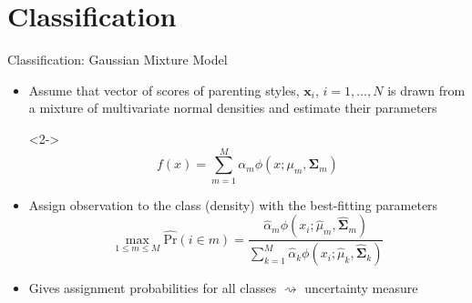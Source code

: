 \documentclass[notes, 12.5pt, aspectratio=169]{beamer}
\begin{document}
\section{Classification}
\begin{frame}{Classification: Gaussian Mixture Model}
	\begin{itemize}[(I)]
		\item<1-> Assume that vector of scores of parenting styles, $\bm{x}_i$, $i=1,\ldots,N$ is drawn from a mixture of multivariate normal densities and estimate their parameters
		\item[]<2-> \begin{equation*} f(x) = \sum_{m=1}^{M} \alpha_m \phi(x; \mu_m, \bm{\Sigma}_m) \end{equation*}
		\item<3-> Assign observation to the class (density) with the best-fitting parameters \begin{equation*}
			\max_{1 \leqslant m \leqslant M} \widehat{\text{Pr}}(i \in m) = \frac{\widehat{\alpha}_m \phi(x_i; \widehat{\mu}_m, \widehat{\bm{\Sigma}}_m)}{\sum_{k=1}^{M} \widehat{\alpha}_k \phi(x_i; \widehat{\mu}_k, \widehat{\bm{\Sigma}}_k)}
		\end{equation*}
	\item<4-> Gives assignment probabilities for all classes $\rightsquigarrow$ uncertainty measure
	\end{itemize}
\end{frame}
\end{document}
